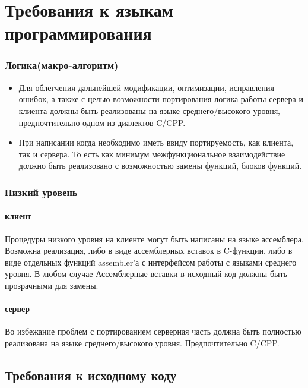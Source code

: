 \section{Требования к языкам программирования}

\subsubsection{Логика(макро-алгоритм)}

\begin{itemize}
\item{ Для облегчения дальнейшей модификации, оптимизации, исправления ошибок,
а также с целью возможности портирования логика работы сервера и клиента
должны быть реализованы на языке среднего/высокого уровня,
предпочтительно одном из диалектов C/CPP.
}
\item{ При написании когда необходимо иметь ввиду портируемость, как клиента,
так и сервера. То есть как минимум межфункциональное взаимодействие
должно быть реализовано с возможностью замены функций, блоков функций.
}
\end{itemize}


\subsubsection{Низкий уровень}

\paragraph{клиент\\}
Процедуры низкого уровня на клиенте могут быть написаны на языке
ассемблера. Возможна реализация, либо в виде ассемблерных вставок в
C-функции, либо в виде отдельных функций assembler'а с интерфейсом
работы с языками среднего уровня. В любом случае  Ассемблерные вставки в
исходный код должны быть прозрачными для замены.


\paragraph{сервер\\}
Во избежание проблем с портированием серверная часть должна быть
полностью реализована на языке среднего/высокого уровня.
Предпочтительно C/CPP.

\subsection{Требования к исходному коду}

